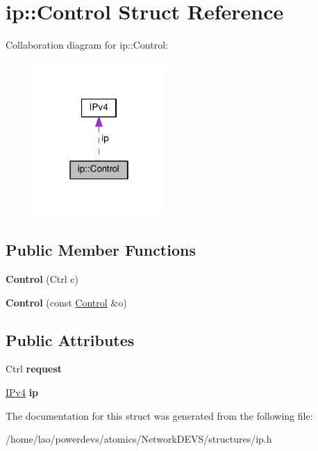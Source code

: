 \hypertarget{structip_1_1Control}{}\section{ip\+:\+:Control Struct Reference}
\label{structip_1_1Control}


Collaboration diagram for ip\+:\+:Control\+:\nopagebreak
\begin{figure}[H]
\begin{center}
\leavevmode
\includegraphics[width=142pt]{structip_1_1Control__coll__graph}
\end{center}
\end{figure}
\subsection*{Public Member Functions}
\begin{DoxyCompactItemize}
\item 
{\bfseries Control} (Ctrl c)\hypertarget{structip_1_1Control_a32ecd23afdfd205d5b7c7fb780f918ae}{}\label{structip_1_1Control_a32ecd23afdfd205d5b7c7fb780f918ae}

\item 
{\bfseries Control} (const \hyperlink{structip_1_1Control}{Control} \&o)\hypertarget{structip_1_1Control_a082e14e4b06f64d456fb417656ec5f73}{}\label{structip_1_1Control_a082e14e4b06f64d456fb417656ec5f73}

\end{DoxyCompactItemize}
\subsection*{Public Attributes}
\begin{DoxyCompactItemize}
\item 
Ctrl {\bfseries request}\hypertarget{structip_1_1Control_a4d825322ee770bf17c4921947bb98bc6}{}\label{structip_1_1Control_a4d825322ee770bf17c4921947bb98bc6}

\item 
\hyperlink{structIPv4}{I\+Pv4} {\bfseries ip}\hypertarget{structip_1_1Control_aa8de1b05503ff62f1af2032c8d1861e5}{}\label{structip_1_1Control_aa8de1b05503ff62f1af2032c8d1861e5}

\end{DoxyCompactItemize}


The documentation for this struct was generated from the following file\+:\begin{DoxyCompactItemize}
\item 
/home/lao/powerdevs/atomics/\+Network\+D\+E\+V\+S/structures/ip.\+h\end{DoxyCompactItemize}
